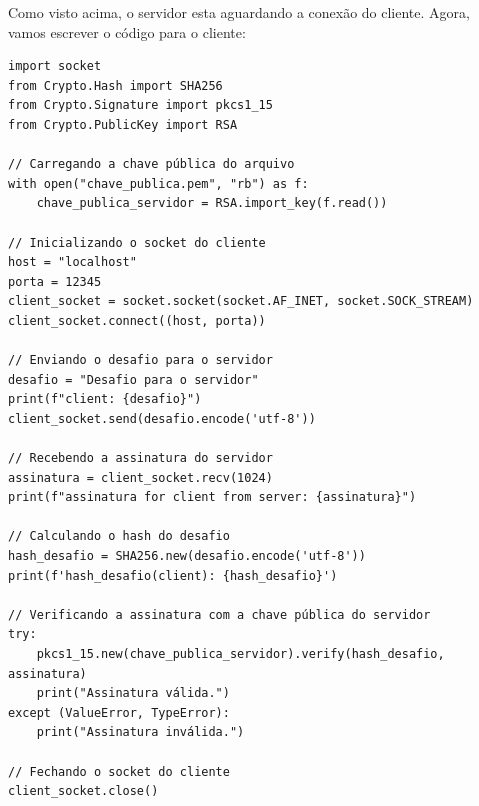 \documentclass[a4paper,12pt]{article}
\newcommand{\printingbibliography}{%

    \pagestyle{myheadings}
    \markright{}
    \sloppy
    \printbibliography[heading=bibintoc, %
                   title=Refer\^encias %
                  ]
    \fussy%
}
\begin{document}
Como visto acima, o servidor esta aguardando a conex\~ao
do cliente. Agora, vamos escrever o c\'odigo para o cliente:

\begin{listing}[!ht]
\begin{verbatim}
import socket
from Crypto.Hash import SHA256
from Crypto.Signature import pkcs1_15
from Crypto.PublicKey import RSA

// Carregando a chave pública do arquivo
with open("chave_publica.pem", "rb") as f:
    chave_publica_servidor = RSA.import_key(f.read())

// Inicializando o socket do cliente
host = "localhost"
porta = 12345
client_socket = socket.socket(socket.AF_INET, socket.SOCK_STREAM)
client_socket.connect((host, porta))

// Enviando o desafio para o servidor
desafio = "Desafio para o servidor"
print(f"client: {desafio}")
client_socket.send(desafio.encode('utf-8'))

// Recebendo a assinatura do servidor
assinatura = client_socket.recv(1024)
print(f"assinatura for client from server: {assinatura}")

// Calculando o hash do desafio
hash_desafio = SHA256.new(desafio.encode('utf-8'))
print(f'hash_desafio(client): {hash_desafio}')

// Verificando a assinatura com a chave pública do servidor
try:
    pkcs1_15.new(chave_publica_servidor).verify(hash_desafio, assinatura)
    print("Assinatura válida.")
except (ValueError, TypeError):
    print("Assinatura inválida.")

// Fechando o socket do cliente
client_socket.close()

\end{verbatim}
\end{listing}
\printingbibliography
\end{document}
